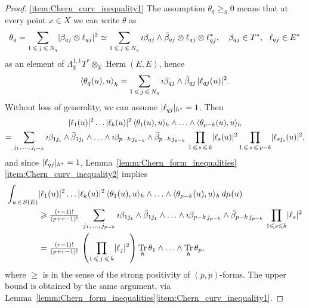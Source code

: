 \documentclass[AHL,Unicode,longabstracts,published]{cedram}
\DeclareMathOperator{\Herm}{Herm}
\DeclareMathOperator{\Tr}{Tr}
\DeclarePairedDelimiter{\abs}{\lvert}{\rvert}
\newcommand*\bR{\mathbb{R}}
\let\leq\leqslant
\let\geq\geqslant
\begin{document}
\begin{proof}
\eqref{item:Chern_curv_inequality1} The assumption $\theta_q\geq_S 0$ means that at every point
$x\in X$ we can write $\theta$ as
\[
\theta_q=\sum_{1\,\leq\,j\,\leq\,N_q}\abs{\beta_{qj}\otimes\ell_{qj}}^2
\simeq \sum_{1\,\leq\,j\,\leq\,N_q}\imath\beta_{qj}\wedge\bar\beta_{qj}
\otimes\ell_{qj}\otimes\ell_{qj}^*,\quad\beta_{qj}\in T^*,~~\ell_{qj}\in E^*
\]
as an element of $\Lambda_\bR^{1,1}T^*\otimes_\bR\Herm(E,E)$, hence
\[
\left\langle\theta_q(u),u\right\rangle_h=\sum_{1\,\leq\,j\,\leq\, N_q}
\imath\beta_{qj}\wedge\bar\beta_{qj}\,\abs{\ell_{qj}(u)}^2.
\]
Without loss of generality, we can assume $\abs{\ell_{qj}}_{h^*}=1$. Then
\begin{multline*}
\abs{\ell_1(u)}^2\ldots\abs{\ell_k(u)}^2\,\langle\theta_1(u),u\rangle_h\wedge
\ldots\wedge\langle\theta_{p-k}(u),u\rangle_h
\\
=\sum_{j_1,\,\dotsc,\,j_{p-k}}
\imath\beta_{1j_1}\wedge\bar\beta_{1j_1}\wedge\ldots\wedge
\imath\beta_{p-k\,j_{p-k}}\wedge\bar\beta_{p-k\,j_{p-k}}\,
\prod_{1\,\leq\,s\,\leq\,k}\abs{\ell_s(u)}^2\prod_{1\,\leq\,s\,\leq\,p-k}\abs{\ell_{sj_s}(u)}^2,
\end{multline*}
and since $\abs{\ell_{qj}}_{h^*}=1$, Lemma~\ref{lemm:Chern_form_inequalities}\eqref{item:Chern_curv_inequality2} implies
\begin{align*}
\int_{u\,\in\,S(E)}&\abs{\ell_1(u)}^2\ldots\abs{\ell_k(u)}^2\,
\langle\theta_1(u),u\rangle_h\wedge\ldots\wedge
\langle\theta_{p-k}(u),u\rangle_h\,d\mu(u)\\
&\geq \tfrac{(r-1)!}{(p+r-1)!}~
\sum_{j_1,\,\dotsc,\,j_{p-k}}\imath\beta_{1j_1}\wedge\bar\beta_{1j_1}
\wedge\ldots\wedge\imath\beta_{p-k\,j_{p-k}}\wedge\bar\beta_{p-k\,j_{p-k}}\,
\prod_{1\leq s\leq k}\abs{\ell_s}^2\\
&=\tfrac{(r-1)!}{(p+r-1)!}\,\left(\prod_{1\,\leq\,j\,\leq\,k}\abs{\ell_j}^2\right)
\Tr_h\theta_1\wedge\ldots\wedge\Tr_h\theta_p,
\end{align*}
where $\geq$ is in the sense of the strong positivity of $(p,p)$-forms. The upper bound is obtained by the same argument, via Lemma~\ref{lemm:Chern_form_inequalities}\eqref{item:Chern_curv_inequality1}.



\end{proof}
\end{document}
